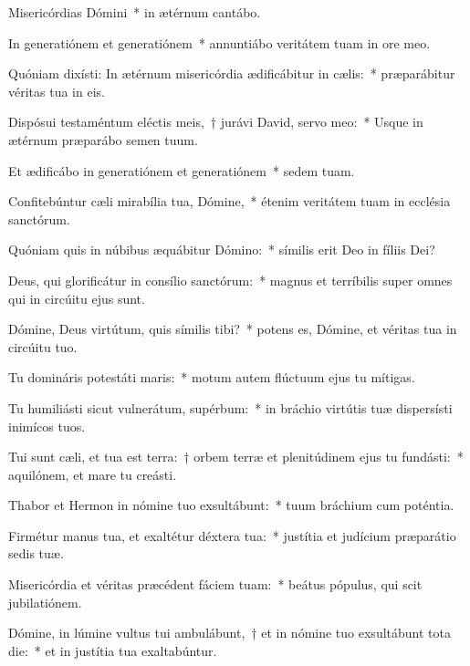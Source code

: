 \item Misericórdias Dómini~* in ætérnum cantábo.

\item In generatiónem et generatiónem~* annuntiábo veritátem tuam in ore meo.

\item Quóniam dixísti: In ætérnum misericórdia ædificábitur in cælis:~* præparábitur véritas tua in eis.

\item Dispósui testaméntum eléctis meis,~† jurávi David, servo meo:~* Usque in ætérnum præparábo semen tuum.

\item Et ædificábo in generatiónem et generatiónem~* sedem tuam.

\item Confitebúntur cæli mirabília tua, Dómine,~* étenim veritátem tuam in ecclésia sanctórum.

\item Quóniam quis in núbibus æquábitur Dómino:~* símilis erit Deo in fíliis Dei?

\item Deus, qui glorificátur in consílio sanctórum:~* magnus et terríbilis super omnes qui in circúitu ejus sunt.

\item Dómine, Deus virtútum, quis símilis tibi?~* potens es, Dómine, et véritas tua in circúitu tuo.

\item Tu domináris potestáti maris:~* motum autem flúctuum ejus tu mítigas.

\item Tu humiliásti sicut vulnerátum, supérbum:~* in bráchio virtútis tuæ dispersísti inimícos tuos.

\item Tui sunt cæli, et tua est terra:~† orbem terræ et plenitúdinem ejus tu fundásti:~* aquilónem, et mare tu creásti.

\item Thabor et Hermon in nómine tuo exsultábunt:~* tuum bráchium cum poténtia.

\item Firmétur manus tua, et exaltétur déxtera tua:~* justítia et judícium præparátio sedis tuæ.

\item Misericórdia et véritas præcédent fáciem tuam:~* beátus pópulus, qui scit jubilatiónem.

\item Dómine, in lúmine vultus tui ambulábunt,~† et in nómine tuo exsultábunt tota die:~* et in justítia tua exaltabúntur.

